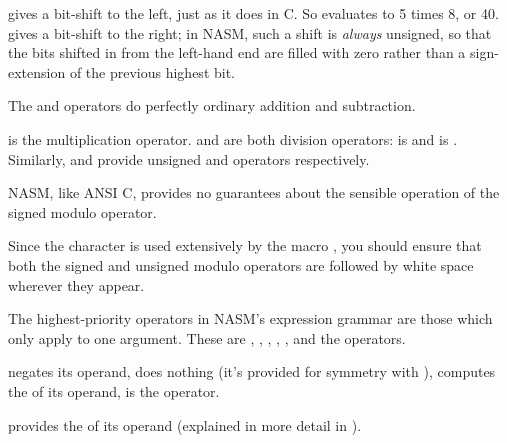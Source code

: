 
\code{<<} gives a bit-shift to the left, just as it does in C.
So  evaluates to 5 times 8, or 40. \code{>>} gives
a bit-shift to the right; in NASM, such a shift is \emph{always}
unsigned, so that the bits shifted in from the left-hand end
are filled with zero rather than a sign-extension of the
previous highest bit.


The \code{+} and \code{-} operators do perfectly ordinary addition
and subtraction.


\code{*} is the multiplication operator. \code{/} and \code{//} are both
division operators: \code{/} is  and
\code{//} is . Similarly, \code{\%} and
\code{\%\%} provide unsigned
and  operators respectively.

NASM, like ANSI C, provides no guarantees about the sensible
operation of the signed modulo operator.

Since the \code{\%} character is used extensively by the macro
, you should ensure that both the signed
and unsigned modulo operators are followed by white space wherever
they appear.


The highest-priority operators in NASM's expression grammar are those
which only apply to one argument. These are \code{+},
\code{-}, \codeindex{\textasciitilde},
\code{!}, , and the
 operators.

\code{-} negates its operand, \code{+} does nothing (it's provided for
symmetry with \code{-}), \code{\textasciitilde} computes the
 of its operand, \code{!} is the
 operator.

 provides the 
of its operand (explained in more detail in ).

